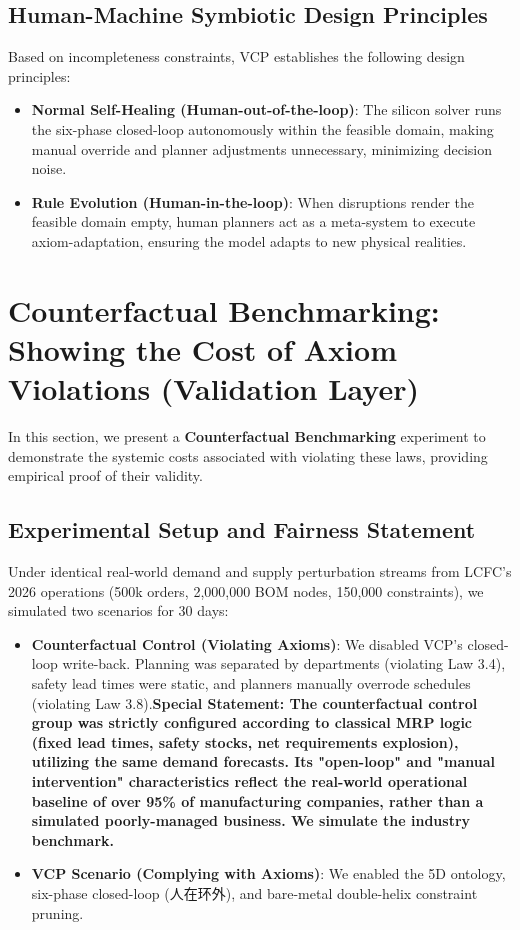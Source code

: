 \documentclass[11pt,a4paper]{article}
\begin{document}
\subsection{Human-Machine Symbiotic Design Principles}
Based on incompleteness constraints, VCP establishes the following design principles:
\begin{itemize}
    \item \textbf{Normal Self-Healing (Human-out-of-the-loop)}: The silicon solver runs the six-phase closed-loop autonomously within the feasible domain, making manual override and planner adjustments unnecessary, minimizing decision noise.
    \item \textbf{Rule Evolution (Human-in-the-loop)}: When disruptions render the feasible domain empty, human planners act as a meta-system to execute axiom-adaptation, ensuring the model adapts to new physical realities.
\end{itemize}

\section{Counterfactual Benchmarking: Showing the Cost of Axiom Violations (Validation Layer)}
In this section, we present a \textbf{Counterfactual Benchmarking} experiment to demonstrate the systemic costs associated with violating these laws, providing empirical proof of their validity.

\subsection{Experimental Setup and Fairness Statement}
Under identical real-world demand and supply perturbation streams from LCFC's 2026 operations (500k orders, 2,000,000 BOM nodes, 150,000 constraints), we simulated two scenarios for 30 days:
\begin{itemize}
    \item \textbf{Counterfactual Control (Violating Axioms)}: We disabled VCP's closed-loop write-back. Planning was separated by departments (violating Law 3.4), safety lead times were static, and planners manually overrode schedules (violating Law 3.8).\textbf{Special Statement: The counterfactual control group was strictly configured according to classical MRP logic (fixed lead times, safety stocks, net requirements explosion), utilizing the same demand forecasts. Its "open-loop" and "manual intervention" characteristics reflect the real-world operational baseline of over 95\% of manufacturing companies, rather than a simulated poorly-managed business. We simulate the industry benchmark.}
    \item \textbf{VCP Scenario (Complying with Axioms)}: We enabled the 5D ontology, six-phase closed-loop (人在环外), and bare-metal double-helix constraint pruning.
\end{itemize}
\end{document}
